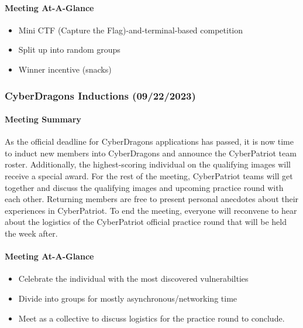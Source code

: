 \documentclass[
  letterpaper,
  DIV=11,
  numbers=noendperiod]{scrartcl}
\let\oldparagraph\paragraph
\renewcommand{\paragraph}[1]{\oldparagraph{#1}\mbox{}}
\providecommand{\tightlist}{%
  \setlength{\itemsep}{0pt}\setlength{\parskip}{0pt}}\usepackage{longtable,booktabs,array}
\begin{document}
\hypertarget{meeting-at-a-glance-2}{%
\paragraph{Meeting At-A-Glance}\label{meeting-at-a-glance-2}}

\begin{itemize}
\tightlist
\item
  Mini CTF (Capture the Flag)-and-terminal-based competition
\item
  Split up into random groups
\item
  Winner incentive (snacks)
\end{itemize}

\hypertarget{cyberdragons-inductions-09222023}{%
\subsubsection{CyberDragons Inductions
(09/22/2023)}\label{cyberdragons-inductions-09222023}}

\hypertarget{meeting-summary-3}{%
\paragraph{Meeting Summary}\label{meeting-summary-3}}

As the official deadline for CyberDragons applications has passed, it is
now time to induct new members into CyberDragons and announce the
CyberPatriot team roster. Additionally, the highest-scoring individual
on the qualifying images will receive a special award. For the rest of
the meeting, CyberPatriot teams will get together and discuss the
qualifying images and upcoming practice round with each other. Returning
members are free to present personal anecdotes about their experiences
in CyberPatriot. To end the meeting, everyone will reconvene to hear
about the logistics of the CyberPatriot official practice round that
will be held the week after.

\hypertarget{meeting-at-a-glance-3}{%
\paragraph{Meeting At-A-Glance}\label{meeting-at-a-glance-3}}

\begin{itemize}
\tightlist
\item
  Celebrate the individual with the most discovered vulnerabilties
\item
  Divide into groups for mostly asynchronous/networking time
\item
  Meet as a collective to discuss logistics for the practice round to
  conclude.
\end{itemize}
\end{document}
